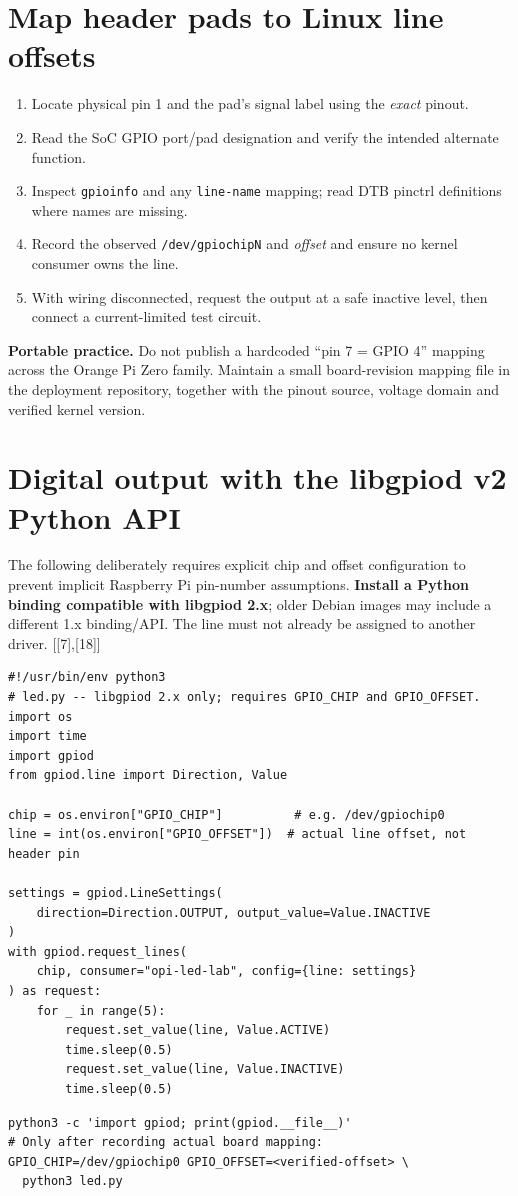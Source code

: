 \documentclass[10pt,oneside,openany]{report}
\newcommand{\code}[1]{\texttt{#1}}
\newcommand{\smallref}[1]{{\sffamily\scriptsize\color{slate}[#1]}}
\begin{document}
\section{Map header pads to Linux line offsets}
\begin{enumerate}
\item Locate physical pin 1 and the pad's signal label using the \emph{exact} pinout.
\item Read the SoC GPIO port/pad designation and verify the intended alternate function.
\item Inspect \code{gpioinfo} and any \code{line-name} mapping; read DTB pinctrl definitions where names are missing.
\item Record the observed \code{/dev/gpiochipN} and \emph{offset} and ensure no kernel consumer owns the line.
\item With wiring disconnected, request the output at a safe inactive level, then connect a current-limited test circuit.
\end{enumerate}
\begin{fieldnote}
\textbf{Portable practice.} Do not publish a hardcoded ``pin 7 = GPIO 4'' mapping across the Orange Pi Zero family. Maintain a small board-revision mapping file in the deployment repository, together with the pinout source, voltage domain and verified kernel version.
\end{fieldnote}
\section{Digital output with the libgpiod v2 Python API}
The following deliberately requires explicit chip and offset configuration to prevent implicit Raspberry Pi pin-number assumptions. \textbf{Install a Python binding compatible with libgpiod 2.x}; older Debian images may include a different 1.x binding/API. The line must not already be assigned to another driver. \smallref{[7],[18]}
\begin{lstlisting}[style=python]
#!/usr/bin/env python3
# led.py -- libgpiod 2.x only; requires GPIO_CHIP and GPIO_OFFSET.
import os
import time
import gpiod
from gpiod.line import Direction, Value

chip = os.environ["GPIO_CHIP"]          # e.g. /dev/gpiochip0
line = int(os.environ["GPIO_OFFSET"])  # actual line offset, not header pin

settings = gpiod.LineSettings(
    direction=Direction.OUTPUT, output_value=Value.INACTIVE
)
with gpiod.request_lines(
    chip, consumer="opi-led-lab", config={line: settings}
) as request:
    for _ in range(5):
        request.set_value(line, Value.ACTIVE)
        time.sleep(0.5)
        request.set_value(line, Value.INACTIVE)
        time.sleep(0.5)
\end{lstlisting}
\begin{lstlisting}[style=sh]
python3 -c 'import gpiod; print(gpiod.__file__)'
# Only after recording actual board mapping:
GPIO_CHIP=/dev/gpiochip0 GPIO_OFFSET=<verified-offset> \
  python3 led.py
\end{lstlisting}
\end{document}
